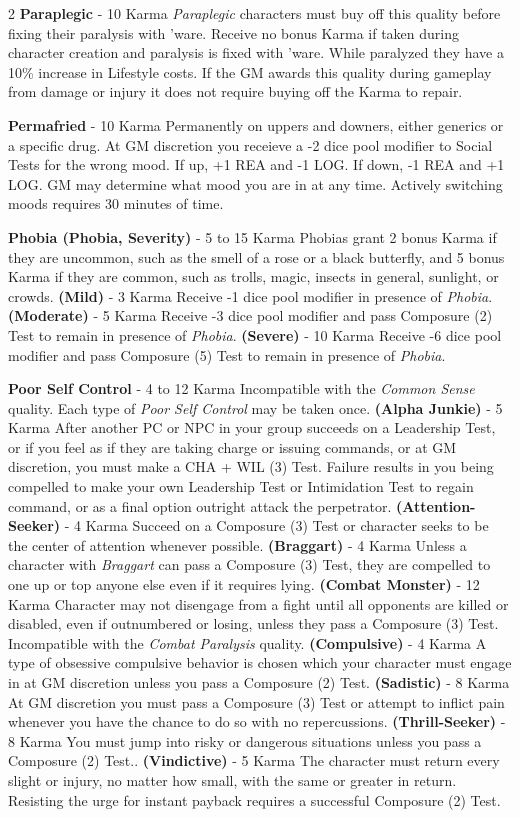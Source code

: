 \documentclass[
  oneside]{article}
\begin{document}
\begin{multicols}{2}
\textbf{Paraplegic} - 10 Karma \emph{Paraplegic}
characters must buy off this quality before fixing
their paralysis with 'ware. Receive no bonus Karma
if taken during character creation and paralysis
is fixed with 'ware. While paralyzed they have a
10\% increase in Lifestyle costs. If the GM awards
this quality during gameplay from damage or injury
it does not require buying off the Karma to
repair.

\textbf{Permafried} - 10 Karma Permanently on
uppers and downers, either generics or a specific
drug. At GM discretion you receieve a -2 dice pool
modifier to Social Tests for the wrong mood. If
up, +1 REA and -1 LOG. If down, -1 REA and +1 LOG.
GM may determine what mood you are in at any time.
Actively switching moods requires 30 minutes of
time.

\textbf{Phobia (Phobia, Severity)} - 5 to 15 Karma
Phobias grant 2 bonus Karma if they are uncommon,
such as the smell of a rose or a black butterfly,
and 5 bonus Karma if they are common, such as
trolls, magic, insects in general, sunlight, or
crowds. \textbf{(Mild)} - 3 Karma Receive -1 dice
pool modifier in presence of \emph{Phobia}.
\textbf{(Moderate)} - 5 Karma Receive -3 dice pool
modifier and pass Composure (2) Test to remain in
presence of \emph{Phobia}. \textbf{(Severe)} - 10
Karma Receive -6 dice pool modifier and pass
Composure (5) Test to remain in presence of
\emph{Phobia}.

\textbf{Poor Self Control} - 4 to 12 Karma
Incompatible with the \emph{Common Sense} quality.
Each type of \emph{Poor Self Control} may be taken
once. \textbf{(Alpha Junkie)} - 5 Karma After
another PC or NPC in your group succeeds on a
Leadership Test, or if you feel as if they are
taking charge or issuing commands, or at GM
discretion, you must make a CHA + WIL (3) Test.
Failure results in you being compelled to make
your own Leadership Test or Intimidation Test to
regain command, or as a final option outright
attack the perpetrator.
\textbf{(Attention-Seeker)} - 4 Karma Succeed on a
Composure (3) Test or character seeks to be the
center of attention whenever possible.
\textbf{(Braggart)} - 4 Karma Unless a character
with \emph{Braggart} can pass a Composure (3)
Test, they are compelled to one up or top anyone
else even if it requires lying. \textbf{(Combat
Monster)} - 12 Karma Character may not disengage
from a fight until all opponents are killed or
disabled, even if outnumbered or losing, unless
they pass a Composure (3) Test. Incompatible with
the \emph{Combat Paralysis} quality.
\textbf{(Compulsive)} - 4 Karma A type of
obsessive compulsive behavior is chosen which your
character must engage in at GM discretion unless
you pass a Composure (2) Test. \textbf{(Sadistic)}
- 8 Karma At GM discretion you must pass a
Composure (3) Test or attempt to inflict pain
whenever you have the chance to do so with no
repercussions. \textbf{(Thrill-Seeker)} - 8 Karma
You must jump into risky or dangerous situations
unless you pass a Composure (2) Test..
\textbf{(Vindictive)} - 5 Karma The character must
return every slight or injury, no matter how
small, with the same or greater in return.
Resisting the urge for instant payback requires a
successful Composure (2) Test.


\end{multicols}
\end{document}
